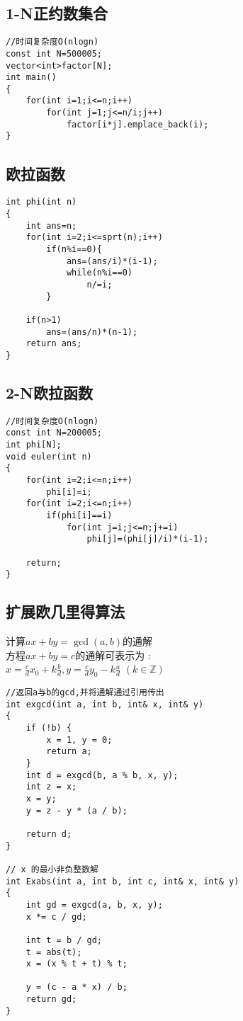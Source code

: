 \documentclass[twocolumn,a4]{article}
\begin{document}
\subsection{1-N正约数集合}
\begin{lstlisting}
//时间复杂度O(nlogn)
const int N=500005;
vector<int>factor[N];
int main()
{
    for(int i=1;i<=n;i++)
        for(int j=1;j<=n/i;j++)
            factor[i*j].emplace_back(i);
}
\end{lstlisting}

\subsection{欧拉函数}
\begin{lstlisting}
int phi(int n)
{
    int ans=n;
    for(int i=2;i<=sprt(n);i++)
        if(n%i==0){
            ans=(ans/i)*(i-1);
            while(n%i==0)
                n/=i;
        }
    
    if(n>1)
        ans=(ans/n)*(n-1);
    return ans;
}
\end{lstlisting}

\subsection{2-N欧拉函数}
\begin{lstlisting}
//时间复杂度O(nlogn)
const int N=200005;
int phi[N];
void euler(int n)
{
    for(int i=2;i<=n;i++)
        phi[i]=i;
    for(int i=2;i<=n;i++)
        if(phi[i]==i)
            for(int j=i;j<=n;j+=i)
                phi[j]=(phi[j]/i)*(i-1);
    
    return;
}
\end{lstlisting}

\subsection{扩展欧几里得算法}
计算$ax+by=\gcd(a,b)$的通解\\
方程$ax+by=c$的通解可表示为 :\\
$x=\frac{c}{d}x_{0}+k\frac{b}{d},y=\frac{c}{d}y_{0}-k\frac{a}{d}$ $(k\in\mathbb{Z})$
\begin{lstlisting}
//返回a与b的gcd,并将通解通过引用传出
int exgcd(int a, int b, int& x, int& y)
{
    if (!b) {
        x = 1, y = 0;
        return a;
    }
    int d = exgcd(b, a % b, x, y);
    int z = x;
    x = y;
    y = z - y * (a / b);

    return d;
}

// x 的最小非负整数解
int Exabs(int a, int b, int c, int& x, int& y)
{
    int gd = exgcd(a, b, x, y);
    x *= c / gd;

    int t = b / gd;
    t = abs(t);
    x = (x % t + t) % t;

    y = (c - a * x) / b;
    return gd;
}
\end{lstlisting}
\end{document}
